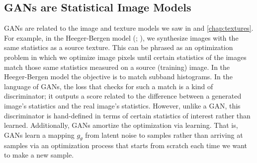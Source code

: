 \subsection{GANs are Statistical Image Models}
GANs are related to the image and texture models we saw in \chaps{\ref{chapter:stat_image_models}} and \ref{chap:textures}. For example, in the Heeger-Bergen model (\sect{\ref{section:Heeger_Bergen}}; \cite{RG:Heeger-Bergen95}), we synthesize images with the same statistics as a source texture. This can be phrased as an optimization problem in which we optimize image pixels until certain statistics of the images match those same statistics measured on a source (training) image. In the Heeger-Bergen model the objective is to match subband histograms. In the language of GANs, the loss that checks for such a match is a kind of discriminator; it outputs a score related to the difference between a generated image's statistics and the real image's statistics. However, unlike a GAN, this discriminator is hand-defined in terms of certain statistics of interest rather than learned. Additionally, GANs amortize the optimization via learning. That is, GANs learn a mapping $g_{\theta}$ from latent noise to samples rather than arriving at samples via an optimization process that starts from scratch each time we want to make a new sample.






